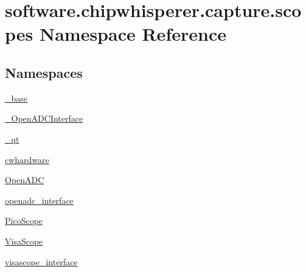 \hypertarget{namespacesoftware_1_1chipwhisperer_1_1capture_1_1scopes}{}\section{software.\+chipwhisperer.\+capture.\+scopes Namespace Reference}
\label{namespacesoftware_1_1chipwhisperer_1_1capture_1_1scopes}
\subsection*{Namespaces}
\begin{DoxyCompactItemize}
\item 
 \hyperlink{namespacesoftware_1_1chipwhisperer_1_1capture_1_1scopes_1_1__base}{\+\_\+base}
\item 
 \hyperlink{namespacesoftware_1_1chipwhisperer_1_1capture_1_1scopes_1_1__OpenADCInterface}{\+\_\+\+Open\+A\+D\+C\+Interface}
\item 
 \hyperlink{namespacesoftware_1_1chipwhisperer_1_1capture_1_1scopes_1_1__qt}{\+\_\+qt}
\item 
 \hyperlink{namespacesoftware_1_1chipwhisperer_1_1capture_1_1scopes_1_1cwhardware}{cwhardware}
\item 
 \hyperlink{namespacesoftware_1_1chipwhisperer_1_1capture_1_1scopes_1_1OpenADC}{Open\+A\+D\+C}
\item 
 \hyperlink{namespacesoftware_1_1chipwhisperer_1_1capture_1_1scopes_1_1openadc__interface}{openadc\+\_\+interface}
\item 
 \hyperlink{namespacesoftware_1_1chipwhisperer_1_1capture_1_1scopes_1_1PicoScope}{Pico\+Scope}
\item 
 \hyperlink{namespacesoftware_1_1chipwhisperer_1_1capture_1_1scopes_1_1VisaScope}{Visa\+Scope}
\item 
 \hyperlink{namespacesoftware_1_1chipwhisperer_1_1capture_1_1scopes_1_1visascope__interface}{visascope\+\_\+interface}
\end{DoxyCompactItemize}
